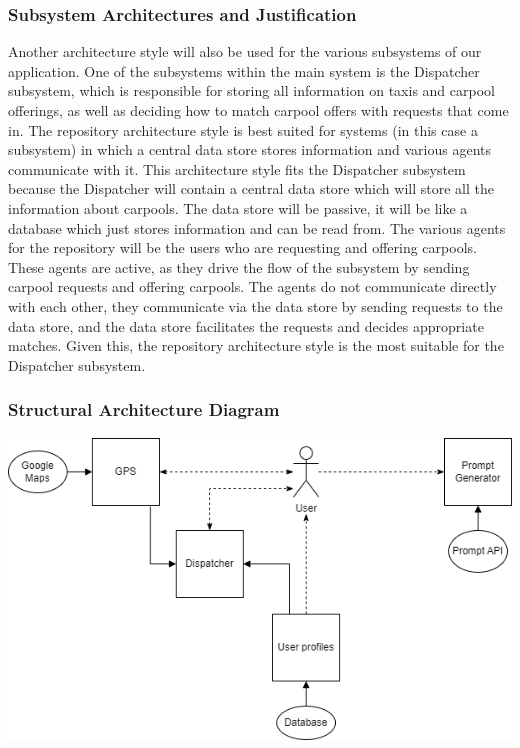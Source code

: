 \documentclass[]{article}
\begin{document}
\subsubsection{Subsystem Architectures and Justification}
Another architecture style will also be used for the various subsystems of our application. One of the subsystems within the main system is the Dispatcher 
subsystem, which is responsible for storing all information on taxis and carpool offerings, as well as deciding how to match carpool offers with 
requests that come in. The repository architecture style is best suited for systems (in this case a subsystem) in which a central data store stores information 
and various agents communicate with it. This architecture style fits the Dispatcher subsystem because the Dispatcher will contain a central data store which 
will store all the information about carpools. The data store will be passive, it will be like a database which just stores information and can be read from. 
The various agents for the repository will be the users who are requesting and offering carpools. These agents are active, as they drive the flow of the 
subsystem by sending carpool requests and offering carpools. The agents do not communicate directly with each other, they communicate via the data store by 
sending requests to the data store, and the data store facilitates the requests and decides appropriate matches. Given this, the repository architecture style 
is the most suitable for the Dispatcher subsystem.

\subsubsection{Structural Architecture Diagram}
\includegraphics[scale = 0.7]{Graphics/subsystems_diagram_3.1.png}
\end{document}
